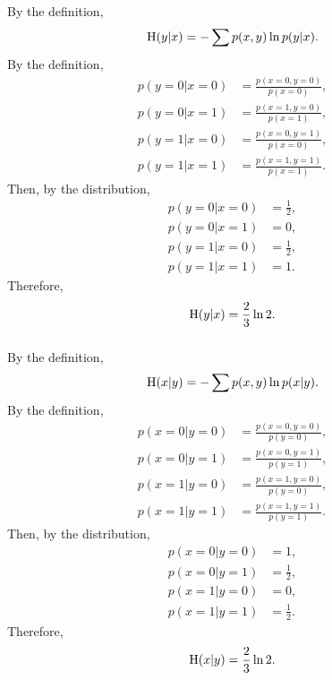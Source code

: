 \subsubsection{}
By the definition,
%
\begin{equation}
{\rm H}(y | x) = - \sum p(x, y) \ln p(y | x).
\end{equation}
%
By the definition,
%
\begin{equation}
\begin{aligned}
p(y = 0 | x = 0) &= \frac{p(x = 0, y = 0)}{p(x = 0)}, \\
p(y = 0 | x = 1) &= \frac{p(x = 1, y = 0)}{p(x = 1)}, \\
p(y = 1 | x = 0) &= \frac{p(x = 0, y = 1)}{p(x = 0)}, \\
p(y = 1 | x = 1) &= \frac{p(x = 1, y = 1)}{p(x = 1)}.
\end{aligned}
\end{equation}
%
Then, by the distribution,
%
\begin{equation}
\begin{aligned}
p(y = 0 | x = 0) &= \frac{1}{2}, \\
p(y = 0 | x = 1) &= 0, \\
p(y = 1 | x = 0) &= \frac{1}{2}, \\
p(y = 1 | x = 1) &= 1.
\end{aligned}
\end{equation}
%
Therefore,
%
\begin{equation}
{\rm H}(y | x) = \frac{2}{3} \ln 2.
\end{equation}
%


\subsubsection{}
By the definition,
%
\begin{equation}
{\rm H}(x | y) = - \sum p(x, y) \ln p(x | y).
\end{equation}
%
By the definition,
%
\begin{equation}
\begin{aligned}
p(x = 0 | y = 0) &= \frac{p(x = 0, y = 0)}{p(y = 0)}, \\
p(x = 0 | y = 1) &= \frac{p(x = 0, y = 1)}{p(y = 1)}, \\
p(x = 1 | y = 0) &= \frac{p(x = 1, y = 0)}{p(y = 0)}, \\
p(x = 1 | y = 1) &= \frac{p(x = 1, y = 1)}{p(y = 1)}.
\end{aligned}
\end{equation}
%
Then, by the distribution,
%
\begin{equation}
\begin{aligned}
p(x = 0 | y = 0) &= 1, \\
p(x = 0 | y = 1) &= \frac{1}{2}, \\
p(x = 1 | y = 0) &= 0, \\
p(x = 1 | y = 1) &= \frac{1}{2}.
\end{aligned}
\end{equation}
%
Therefore,
%
\begin{equation}
{\rm H}(x | y) = \frac{2}{3} \ln 2.
\end{equation}
%


